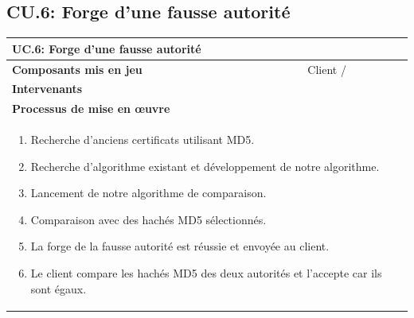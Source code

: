 \documentclass[a4paper,11pt,french]{article}
\begin{document}
\subsection{CU.6: Forge d'une fausse autorité}
\begin{center}
        \vspace*{0.7cm}
        \begin{tabularx}{16cm}{|l|X|}
        \hline
        \multicolumn{2}{|l|}{\textbf{UC.6: Forge d'une fausse autorité}}\\
        \hline
        \textbf{Composants mis en jeu} & Client /    \\
        \hline
        \textbf{Intervenants} &   \\
        \hline
        \multicolumn{2}{|l|}{\textbf{Processus de mise en \oe uvre} }\\
        \hline
        \multicolumn{2}{|p{15cm}|}{\begin{enumerate}\item Recherche d'anciens certificats utilisant MD5. \item Recherche d'algorithme existant et développement de notre algorithme. \item Lancement de notre algorithme de comparaison. \item Comparaison avec des hachés MD5 sélectionnés. \item La forge de la fausse autorité est réussie et envoyée au client. \item Le client compare les hachés MD5 des deux autorités et l'accepte car ils sont égaux.\end{enumerate}}\\ 
        \hline 
        \end{tabularx}
\end{center}
\vspace{2cm}
\end{document}
